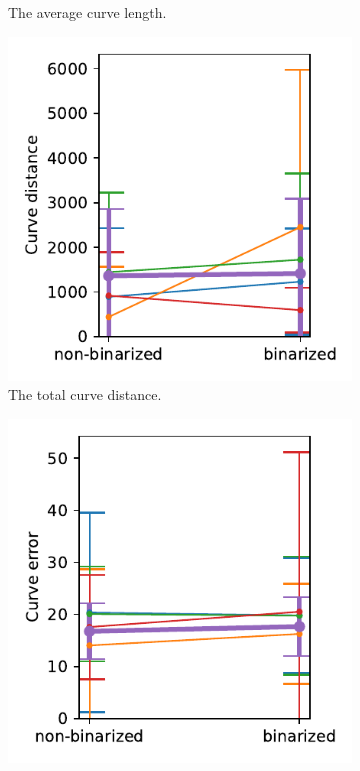 \begin{figure}[h]
\begin{subfigure}{.3\textwidth}
    \caption{The average curve length.}
\end{subfigure}
    \begin{subfigure}{.3\textwidth}
    \centering
    \includegraphics[width=\textwidth]{graphics/eval/curve distance_binarization_tonari.pdf}
    \caption{The total curve distance.}
\end{subfigure}
    \begin{subfigure}{.3\textwidth}
    \centering
    \includegraphics[width=\textwidth]{graphics/eval/curve error_binarization_tonari.pdf}

\end{subfigure}
\end{figure}
